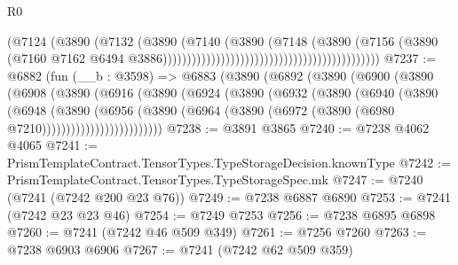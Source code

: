 \begin{lexlean}{R0}
\begin{coremodule}
                                                                        (@7124
                                                                          (@3890
                                                                            (@7132
                                                                              (@3890
                                                                                (@7140
                                                                                  (@3890
                                                                                    (@7148
                                                                                      (@3890
                                                                                        (@7156
                                                                                          (@3890
                                                                                            (@7160
                                                                                              @7162
                                                                                              @6494
                                                                                              @3886)))))))))))))))))))))))))))))))))))))))))))))
@7237 := @6882
    (fun (__b : @3598) =>
    @6883
      (@3890
        (@6892
          (@3890
            (@6900
              (@3890
                (@6908
                  (@3890
                    (@6916
                      (@3890
                        (@6924
                          (@3890
                            (@6932
                              (@3890
                                (@6940
                                  (@3890
                                    (@6948
                                      (@3890
                                        (@6956
                                          (@3890
                                            (@6964
                                              (@3890
                                                (@6972 (@3890 (@6980 @7210)))))))))))))))))))))))))
@7238 := @3891 @3865
@7240 := @7238 @4062 @4065
@7241 := PrismTemplateContract.TensorTypes.TypeStorageDecision.knownType
@7242 := PrismTemplateContract.TensorTypes.TypeStorageSpec.mk
@7247 := @7240 (@7241 (@7242 @200 @23 @76))
@7249 := @7238 @6887 @6890
@7253 := @7241 (@7242 @23 @23 @46)
@7254 := @7249 @7253
@7256 := @7238 @6895 @6898
@7260 := @7241 (@7242 @46 @509 @349)
@7261 := @7256 @7260
@7263 := @7238 @6903 @6906
@7267 := @7241 (@7242 @62 @509 @359)

\end{coremodule}
\end{lexlean}
